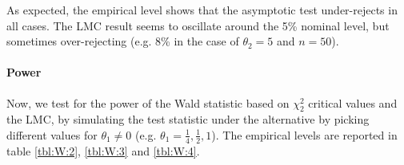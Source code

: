 \documentclass[]{article}\usepackage[]{graphicx}\usepackage[]{color}
\begin{document}
\begin{table}[H]
	\centering
	\caption{Empirical levels for 1000 replications of the Wald statistic where $\alpha = 5\%$ and $\theta_1=0$, testing $H_0: \left[ \theta_1\theta_2, \theta_1\right] =0$ against $H_1: \left[ \theta_1\theta_2, \theta_1\right] \neq 0$}
	\label{tbl:W:1}
\end{table}


As expected, the empirical level shows that the asymptotic test under-rejects in all cases. The LMC result seems to oscillate around the 5\% nominal level, but sometimes over-rejecting (e.g. 8\% in the case of $\theta_2= 5 $ and $n=50$).

\paragraph{Power}

Now, we test for the power of the Wald statistic based on $\chi_2^2$ critical values and the LMC, by simulating the test statistic under the alternative by picking different values for $\theta_1\neq 0$ (e.g. $\theta_1=\frac{1}{4},\frac{1}{2},1$). The empirical levels are reported in table \ref{tbl:W:2}, \ref{tbl:W:3} and \ref{tbl:W:4}.
\end{document}

